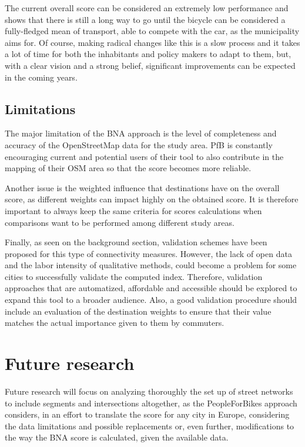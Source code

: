 \documentclass[information,article,submit,moreauthors,Latex,dvi2pdf,10pt,a4paper]{Definitions/mdpi}
\begin{document}
The current overall score can be considered an extremely low performance and shows that there is still a long way to go until the bicycle can be considered a fully-fledged mean of transport, able to compete with the car, as the municipality aims for. Of course, making radical changes like this is a slow process and it takes a lot of time for both the inhabitants and policy makers to adapt to them, but, with a clear vision and a strong belief, significant improvements can be expected in the coming years. 

\subsection{Limitations}
\begin{mycolorbox}[colback=orange]
The major limitation of the BNA approach is the level of completeness and accuracy of the OpenStreetMap data for the study area. PfB is constantly encouraging current and potential users of their tool to also contribute in the mapping of their OSM area so that the score becomes more reliable. 

Another issue is the weighted influence that destinations have on the overall score, as different weights can impact highly on the obtained score. It is therefore important to always keep the same criteria for scores calculations when comparisons want to be performed among different study areas. 

Finally, as seen on the background section, validation schemes have been proposed for this type of connectivity measures. However, the lack of open data and the labor intensity of qualitative methods, could become a problem for some cities to successfully validate the computed index. Therefore, validation approaches that are automatized, affordable and accessible should be explored to expand this tool to a broader audience. Also, a good validation procedure should include an evaluation of the destination weights to ensure that their value matches the actual importance given to them by commuters. 
\end{mycolorbox}

\section{Future research} \label{future}

Future research will focus on analyzing thoroughly the set up of street networks to include segments and intersections altogether, as the PeopleForBikes approach considers, in an effort to translate the score for any city in Europe, considering the data limitations and possible replacements or, even further, modifications to the way the BNA score is calculated, given the available data. 
\end{document}
